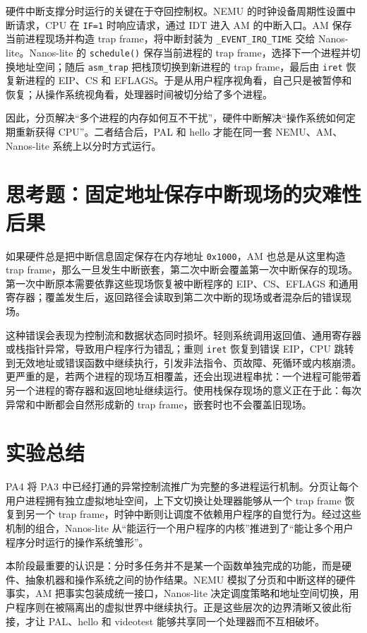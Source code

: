 硬件中断支撑分时运行的关键在于夺回控制权。NEMU 的时钟设备周期性设置中断请求，CPU 在 \texttt{IF=1} 时响应请求，通过 IDT 进入 AM 的中断入口。AM 保存当前进程现场并构造 trap frame，将中断封装为 \texttt{\_EVENT\_IRQ\_TIME} 交给 Nanos-lite。Nanos-lite 的 \texttt{schedule()} 保存当前进程的 trap frame，选择下一个进程并切换地址空间；随后 \texttt{asm\_trap} 把栈顶切换到新进程的 trap frame，最后由 \texttt{iret} 恢复新进程的 EIP、CS 和 EFLAGS。于是从用户程序视角看，自己只是被暂停和恢复；从操作系统视角看，处理器时间被切分给了多个进程。

因此，分页解决“多个进程的内存如何互不干扰”，硬件中断解决“操作系统如何定期重新获得 CPU”。二者结合后，PAL 和 hello 才能在同一套 NEMU、AM、Nanos-lite 系统上以分时方式运行。

\section{思考题：固定地址保存中断现场的灾难性后果}

如果硬件总是把中断信息固定保存在内存地址 \texttt{0x1000}，AM 也总是从这里构造 trap frame，那么一旦发生中断嵌套，第二次中断会覆盖第一次中断保存的现场。第一次中断原本需要依靠这些现场恢复被中断程序的 EIP、CS、EFLAGS 和通用寄存器；覆盖发生后，返回路径会读取到第二次中断的现场或者混杂后的错误现场。

这种错误会表现为控制流和数据状态同时损坏。轻则系统调用返回值、通用寄存器或栈指针异常，导致用户程序行为错乱；重则 \texttt{iret} 恢复到错误 EIP，CPU 跳转到无效地址或错误函数中继续执行，引发非法指令、页故障、死循环或内核崩溃。更严重的是，若两个进程的现场互相覆盖，还会出现进程串扰：一个进程可能带着另一个进程的寄存器和返回地址继续运行。使用栈保存现场的意义正在于此：每次异常和中断都会自然形成新的 trap frame，嵌套时也不会覆盖旧现场。

\section{实验总结}

PA4 将 PA3 中已经打通的异常控制流推广为完整的多进程运行机制。分页让每个用户进程拥有独立虚拟地址空间，上下文切换让处理器能够从一个 trap frame 恢复到另一个 trap frame，时钟中断则让调度不依赖用户程序的自觉行为。经过这些机制的组合，Nanos-lite 从“能运行一个用户程序的内核”推进到了“能让多个用户程序分时运行的操作系统雏形”。

本阶段最重要的认识是：分时多任务并不是某一个函数单独完成的功能，而是硬件、抽象机器和操作系统之间的协作结果。NEMU 模拟了分页和中断这样的硬件事实，AM 把事实包装成统一接口，Nanos-lite 决定调度策略和地址空间切换，用户程序则在被隔离出的虚拟世界中继续执行。正是这些层次的边界清晰又彼此衔接，才让 PAL、hello 和 videotest 能够共享同一个处理器而不互相破坏。
